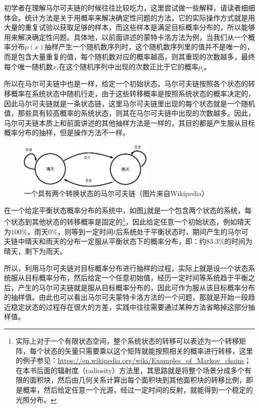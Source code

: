 初学者在理解马尔可夫链的时候往往比较吃力，这里尝试做一些解释，请读者细细体会。统计方法是关于用概率来解决确定性问题的方法，它的实际操作方式就是用大量的重复试验以获取足够的样本，而这些样本是满足目标概率分布的，所以能够用来解决确定性问题。具体地，以前面讲述的蒙特卡洛方法为例，当我们从一个概率分布$p(x)$抽样产生一个随机数序列时，这个随机数序列里的值并不是唯一的，而是包含大量重复的值，每个随机数对应的概率越高，则其重现的次数越多，最终每个唯一随机数$x_i$在这个随机序列中出现的次数正比于它的概率$p_i$。

所以在马尔可夫链中也是一样，给定一个初始状态，马尔可夫链按照各个状态的转移概率在系统状态中随机行走，由于这些转移概率是按照系统状态的概率决定的，因此马尔可夫链就是一条状态链，这里马尔可夫链里出现的每个状态就是一个随机值，那些具有较高概率的系统状态，则其在马尔可夫链中出现的次数越多。因此，马尔可夫链本质上和前面讲述的其他抽样方法是一样的，其目的都是产生服从目标概率分布的抽样，但是操作方法不一样。

\begin{figure}
	\sidecaption
	\includegraphics[width=0.58\textwidth]{figures/mc/markov-chain-example}
	\caption{一个具有两个转换状态的马尔可夫链（图片来自Wikipedia）}
	\label{f:mc-markov-chain}
\end{figure}

在一个给定平衡状态概率分布的系统中，如图\ref{f:mc-markov-chain}就是一个包含两个状态的系统，每个状态到其他状态的转移概率是固定的\footnote{实际上对于一个有限状态空间，整个系统状态的转移可以表述为一个转移矩阵，每个状态的矢量只需要乘以这个矩阵就能按照相关的概率进行转移，这里的例子参见：\url{https://en.wikipedia.org/wiki/Examples_of_Markov_chains}；在本书后面的辐射度（radiosity）方法里，其思路就是将整个场景分成多个有限的面积块，然后由几何关系计算出每个面积块到其他面积块的转移比例，即是概率，然后给定任意一个光源，经过一定时间的反射，就能得到一个稳定的光照分布。}，因此给定任意一个初始状态，例如晴天为$100\%$，雨天$0\%$，则等到一定时间$t$后系统处于平衡状态时，期间产生的马尔可夫链中晴天和雨天的分布一定服从平衡状态下的概率分布，即：约$83.3\%$的时间为晴天，剩下为雨天。

所以，利用马尔可夫链对目标概率分布进行抽样的过程，实际上就是设一个状态系统服从目标概率分布，然后给定一个任意初始值，经历一定时间等系统趋于平衡之后，产生的马尔可夫链就是服从目标概率分布的，因此可作为服从该目标概率分布的抽样值。由此也可以看出马尔可夫蒙特卡洛方法的一个问题，那就是开始一段趋近稳定状态的过程存在很大的方差，实践中往往需要通过某种方法省略掉这部分抽样值。

